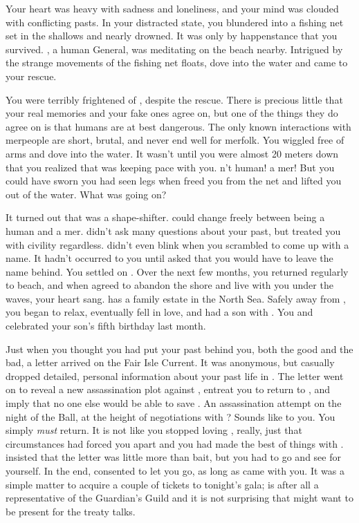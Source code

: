 \documentclass[char]{NeptuneBall}
\begin{document}
Your heart was heavy with sadness and loneliness, and your mind was clouded with conflicting pasts. In your distracted state, you blundered into a fishing net set in the shallows and nearly drowned. It was only by happenstance that you survived. \cGeneral{}, a human General, was meditating on the beach nearby. Intrigued by the strange movements of the fishing net floats, \cGeneral{\they} dove into the water and came to your rescue.

You were terribly frightened of \cGeneral{\them}, despite the rescue. There is precious little that your real memories and your fake ones agree on, but one of the things they do agree on is that humans are at best dangerous. The only known interactions with merpeople are short, brutal, and never end well for merfolk. You wiggled free of \cGeneral{\their} arms and dove into the water. It wasn't until you were almost 20 meters down that you realized that \cGeneral{} was keeping pace with you. \cGeneral{\They} \cGeneral{\were}n't human! \cGeneral{\They} \cGeneral{\were} a mer\cGeneral{\human}! But you could have sworn you had seen legs when \cGeneral{\they} freed you from the net and lifted you out of the water. What was going on? 

It turned out that \cGeneral{} was a shape-shifter. \cGeneral{\They} could change freely between being a human and a mer\cGeneral{\human}. \cGeneral{} didn't ask many questions about your past, but treated you with civility regardless. \cGeneral{\they} didn't even blink when you scrambled to come up with a name. It hadn't occurred to you until \cGeneral{\they} asked that you would have to leave the name \cQueen{} behind. You settled on \cQueen{\MYname}. Over the next few months, you returned regularly to \cGeneral{\their} beach, and when \cGeneral{\they} agreed to abandon the shore and live with you under the waves, your heart sang.  \cGeneral{} has a family estate in the North Sea. Safely away from \pAtlantis{}, you began to relax, eventually fell in love, and had a son with \cGeneral{\them}. You and \cGeneral{} celebrated your son's fifth birthday last month. 

Just when you thought you had put your past behind you, both the good and the bad, a letter arrived on the Fair Isle Current. It was anonymous, but casually dropped detailed, personal information about your past life in \pAtlantis{}. The letter went on to reveal a new assassination plot against \cKing{}, entreat you to return to \pAtlantis{}, and imply that no one else would be able to save \cKing{}. An assassination attempt on the night of the \cExExKing{} Ball, at the height of negotiations with \pPacifica{}? Sounds like \pAssassin{} to you. You simply \emph{must} return. It is not like you stopped loving \cKing{}, really, just that circumstances had forced you apart and you had made the best of things with \cGeneral{}. \cGeneral{} insisted that the letter was little more than bait, but you had to go and see for yourself.  In the end, \cGeneral{} consented to let you go, as long as \cGeneral{\they} came with you. It was a simple matter to acquire a couple of tickets to tonight's gala; \cGeneral{} is after all a representative of the Guardian's Guild and it is not surprising that \cGeneral{\they} might want to be present for the treaty talks.
\end{document}
